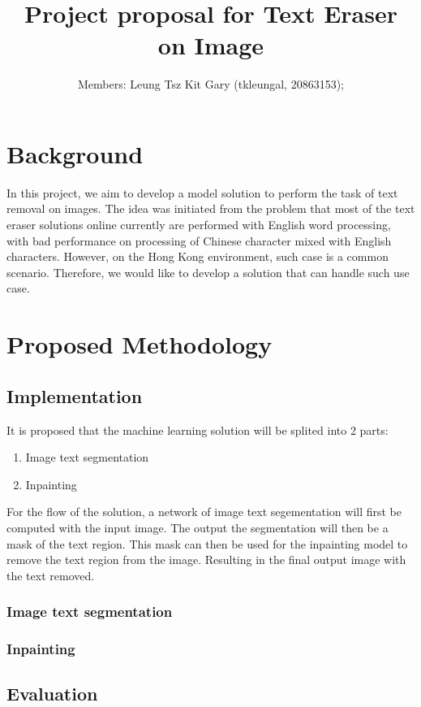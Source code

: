 \documentclass[10pt,twocolumn,letterpaper]{article}
\begin{document}
\title{Project proposal for Text Eraser on Image}

\author{
Members: Leung Tsz Kit Gary (tkleungal, 20863153);  %
}
\maketitle

\section{Background}

In this project, we aim to develop a model solution to perform the task of text removal on images. 
The idea was initiated from the problem that most of the text eraser solutions online currently are performed with English word processing, 
with bad performance on processing of Chinese character mixed with English characters. 
However, on the Hong Kong environment, such case is a common scenario. Therefore, we would like to develop a solution that can handle such use case.

\section{Proposed Methodology}

\subsection{Implementation}

It is proposed that the machine learning solution will be splited into 2 parts:
\begin{enumerate}
    \item Image text segmentation
    \item Inpainting
\end{enumerate}

For the flow of the solution, a network of image text segementation will first be computed with the input image.
The output the segmentation will then be a mask of the text region.
This mask can then be used for the inpainting model to remove the text region from the image.
Resulting in the final output image with the text removed.

\subsubsection{Image text segmentation}

\subsubsection{Inpainting}

\subsection{Evaluation}
\end{document}
